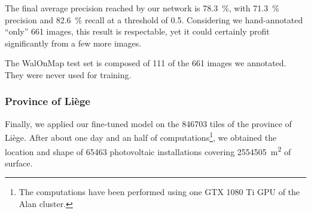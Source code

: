 \documentclass[a4paper, 12pt]{article}
\begin{document}
The final average precision reached by our network is \SI{78.3}{\percent}, with \SI{71.3}{\percent} precision and \SI{82.6}{\percent} recall at a threshold of \num{0.5}. Considering we hand-annotated \enquote{only} 661 images, this result is respectable, yet it could certainly profit significantly from a few more images.

\begin{note}
    The WalOnMap test set is composed of 111 of the 661 images we annotated. They were never used for training.
\end{note}

\subsubsection{Province of Liège}

Finally, we applied our fine-tuned model on the \num{846703} tiles of the province of Liège. After about one day and an half of computations\footnote{The computations have been performed using one GTX 1080 Ti GPU of the Alan cluster.}, we obtained the location and shape of \num{65463} photovoltaic installations covering \SI{2554505}{\meter\squared} of surface.
\end{document}

